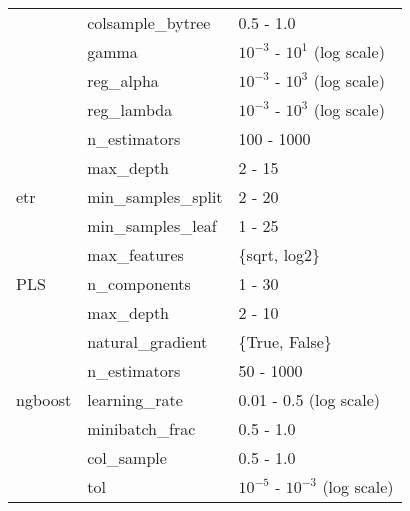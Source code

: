 \begin{table*}[h]
\begin{tabular}{@{}l>{\ttfamily}lp{}@{}}
                               & colsample\_bytree           & 0.5 - 1.0                                 \\ \cmidrule{2-3}
                               & gamma                       & $10^{-3}$ - $10^{1}$ (log scale)          \\ \cmidrule{2-3}
                               & reg\_alpha                  & $10^{-3}$ - $10^{3}$ (log scale)          \\ \cmidrule{2-3}
                               & reg\_lambda                 & $10^{-3}$ - $10^{3}$ (log scale)          \\ \midrule
\multirow{5}{*}{\gls{etr}}     & n\_estimators               & 100 - 1000                                \\ \cmidrule{2-3}
                               & max\_depth                  & 2 - 15                                    \\ \cmidrule{2-3}
                               & min\_samples\_split         & 2 - 20                                    \\ \cmidrule{2-3}
                               & min\_samples\_leaf          & 1 - 25                                    \\ \cmidrule{2-3}
                               & max\_features               & \{sqrt, log2\}                            \\ \midrule
PLS                            & n\_components               & 1 - 30                                    \\ \midrule
\multirow{8}{*}{\gls{ngboost}} & max\_depth                  & 2 - 10                                    \\ \cmidrule{2-3}
                               & natural\_gradient           & \{True, False\}                           \\ \cmidrule{2-3}
                               & n\_estimators               & 50 - 1000                                 \\ \cmidrule{2-3}
                               & learning\_rate              & 0.01 - 0.5 (log scale)                    \\ \cmidrule{2-3}
                               & minibatch\_frac             & 0.5 - 1.0                                 \\ \cmidrule{2-3}
                               & col\_sample                 & 0.5 - 1.0                                 \\ \cmidrule{2-3}
                               & tol                         & $10^{-5}$ - $10^{-3}$ (log scale)         \\ \cmidrule{2-3}

\end{tabular}
\end{table*}
